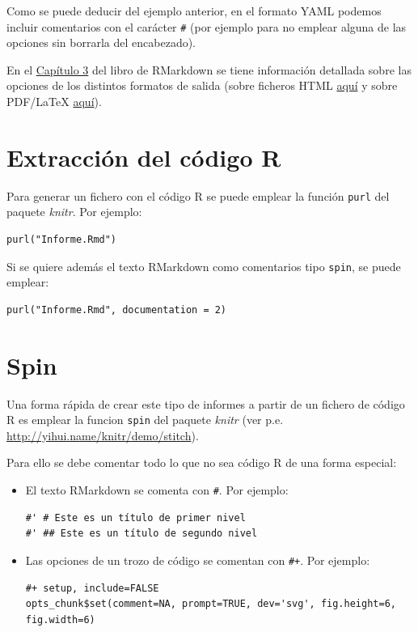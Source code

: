 \documentclass[]{book}
\theoremstyle{definition}
\theoremstyle{definition}
\theoremstyle{definition}
\theoremstyle{remark}
\begin{document}
Como se puede deducir del ejemplo anterior, en el formato YAML podemos
incluir comentarios con el carácter \texttt{\#} (por ejemplo para no
emplear alguna de las opciones sin borrarla del encabezado).

En el
\href{https://bookdown.org/yihui/rmarkdown/documents.html}{Capítulo 3}
del libro de RMarkdown se tiene información detallada sobre las opciones
de los distintos formatos de salida (sobre ficheros HTML
\href{https://bookdown.org/yihui/rmarkdown/html-document.html}{aquí} y
sobre PDF/LaTeX
\href{https://bookdown.org/yihui/rmarkdown/pdf-document.html}{aquí}).

\section{Extracción del código R}\label{extraccion-del-codigo-r}

Para generar un fichero con el código R se puede emplear la función
\texttt{purl} del paquete \emph{knitr}. Por ejemplo:

\begin{verbatim}
purl("Informe.Rmd")
\end{verbatim}

Si se quiere además el texto RMarkdown como comentarios tipo
\texttt{spin}, se puede emplear:

\begin{verbatim}
purl("Informe.Rmd", documentation = 2)
\end{verbatim}

\section{Spin}\label{spin}

Una forma rápida de crear este tipo de informes a partir de un fichero
de código R es emplear la funcion \texttt{spin} del paquete \emph{knitr}
(ver p.e. \url{http://yihui.name/knitr/demo/stitch}).

Para ello se debe comentar todo lo que no sea código R de una forma
especial:

\begin{itemize}
\item
  El texto RMarkdown se comenta con \texttt{\#\textquotesingle{}}. Por
  ejemplo:

\begin{verbatim}
#' # Este es un título de primer nivel
#' ## Este es un título de segundo nivel
\end{verbatim}
\item
  Las opciones de un trozo de código se comentan con \texttt{\#+}. Por
  ejemplo:

\begin{verbatim}
#+ setup, include=FALSE
opts_chunk$set(comment=NA, prompt=TRUE, dev='svg', fig.height=6, fig.width=6)
\end{verbatim}
\end{itemize}
\end{document}
